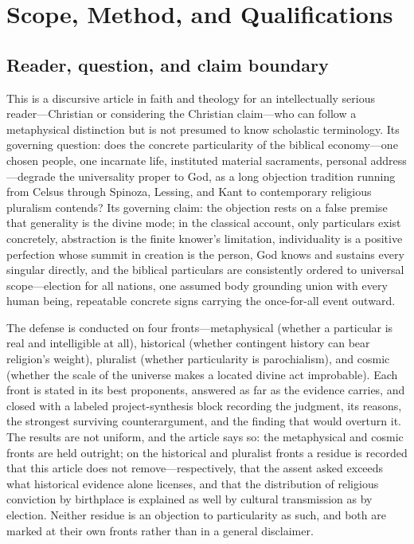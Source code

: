 \section{Scope, Method, and Qualifications}

\subsection{Reader, question, and claim boundary}

This is a discursive article in faith and theology for an intellectually serious reader---Christian or considering the Christian claim---who can follow a metaphysical distinction but is not presumed to know scholastic terminology. Its governing question: does the concrete particularity of the biblical economy---one chosen people, one incarnate life, instituted material sacraments, personal address---degrade the universality proper to God, as a long objection tradition running from Celsus through Spinoza, Lessing, and Kant to contemporary religious pluralism contends? Its governing claim: the objection rests on a false premise that generality is the divine mode; in the classical account, only particulars exist concretely, abstraction is the finite knower's limitation, individuality is a positive perfection whose summit in creation is the person, God knows and sustains every singular directly, and the biblical particulars are consistently ordered to universal scope---election for all nations, one assumed body grounding union with every human being, repeatable concrete signs carrying the once-for-all event outward.

The defense is conducted on four fronts---metaphysical (whether a particular is real and intelligible at all), historical (whether contingent history can bear religion's weight), pluralist (whether particularity is parochialism), and cosmic (whether the scale of the universe makes a located divine act improbable). Each front is stated in its best proponents, answered as far as the evidence carries, and closed with a labeled project-synthesis block recording the judgment, its reasons, the strongest surviving counterargument, and the finding that would overturn it. The results are not uniform, and the article says so: the metaphysical and cosmic fronts are held outright; on the historical and pluralist fronts a residue is recorded that this article does not remove---respectively, that the assent asked exceeds what historical evidence alone licenses, and that the distribution of religious conviction by birthplace is explained as well by cultural transmission as by election. Neither residue is an objection to particularity as such, and both are marked at their own fronts rather than in a general disclaimer.

